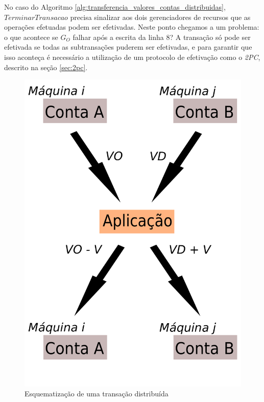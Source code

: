 \documentclass[11pt,twoside,a4paper]{book}
\begin{document}
No caso do Algoritmo \ref{alg:transferencia_valores_contas_distribuidas}, $TerminarTransacao$ precisa sinalizar aos dois gerenciadores de recursos que as operações efetuadas podem ser efetivadas. Neste ponto chegamos a um problema: o que acontece se $G_O$ falhar após a escrita da linha 8? A transação só pode ser efetivada se todas as subtransações puderem ser efetivadas, e para garantir que isso aconteça é necessário a utilização de um protocolo de efetivação como o \emph{2PC}, descrito na seção \ref{sec:2pc}.


\begin{figure}
  \centering
  \includegraphics[width=.40\textwidth]{transacao_distribuida} 
  \caption{Esquematização de uma transação distribuída}
  \label{fig:transacao_distribuida} 
\end{figure}


\end{document}
